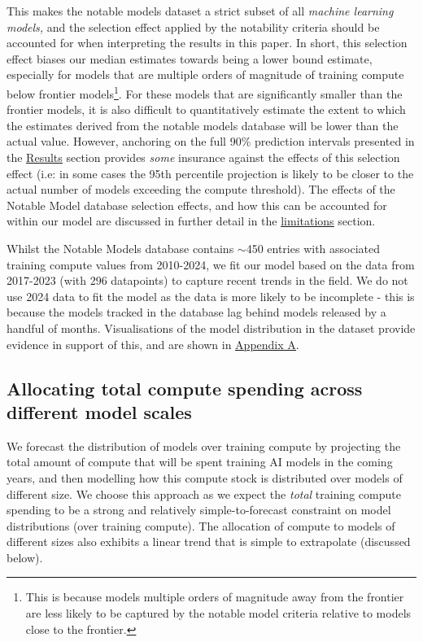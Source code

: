 \documentclass[11pt]{article}
\begin{document}
This makes the notable models dataset a strict subset of all \textit{machine learning models,} and the selection effect applied by the notability criteria should be accounted for when interpreting the results in this paper. In short, this selection effect biases our median estimates towards being a lower bound estimate, especially for models that are multiple orders of magnitude of training compute below frontier models\footnote{This is because models multiple orders of magnitude away from the frontier are less likely to be captured by the notable model criteria relative to models close to the frontier.}. For these models that are significantly smaller than the frontier models, it is also difficult to quantitatively estimate the extent to which the estimates derived from the notable models database will be lower than the actual value. However, anchoring on the full 90\% prediction intervals presented in the \underline{\hyperref[results]{Results}} section provides \textit{some} insurance against the effects of this selection effect (i.e: in some cases the 95th percentile projection is likely to be closer to the actual number of models exceeding the compute threshold). The effects of the Notable Model database selection effects, and how this can be accounted for within our model are discussed in further detail in the \underline{\hyperref[notable-models-selection-effect]{limitations}} section.

Whilst the Notable Models database contains $\sim$450 entries with associated training compute values from 2010-2024, we fit our model based on the data from 2017-2023 (with 296 datapoints) to capture recent trends in the field. We do not use 2024 data to fit the model as the data is more likely to be incomplete - this is because the models tracked in the database lag behind models released by a handful of months. Visualisations of the model distribution in the dataset provide evidence in support of this, and are shown in \underline{\hyperref[appendix-a-historical-distribution-of-notable-models-and-fit-data-choice]{Appendix A}}.

\subsection{Allocating total compute spending across different model scales}

We forecast the distribution of models over training compute by projecting the total amount of compute that will be spent training AI models in the coming years, and then modelling how this compute stock is distributed over models of different size. We choose this approach as we expect the \textit{total} training compute spending to be a strong and relatively simple-to-forecast constraint on model distributions (over training compute). The allocation of compute to models of different sizes also exhibits a linear trend that is simple to extrapolate (discussed below).
\end{document}
